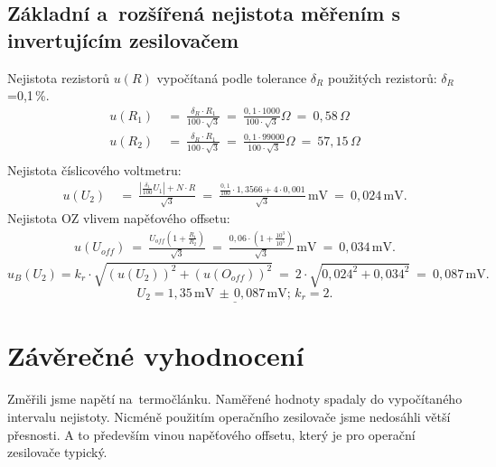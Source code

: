 \documentclass[a4paper,12pt]{article}   %
\begin{document}
\subsection{Základní a~rozšířená nejistota měřením s invertujícím zesilovačem}
Nejistota rezistorů $u(R)$ vypočítaná podle tolerance $\delta_R$ použitých rezistorů: $\delta_R$=0,1\,\%.
\begin{equation*}
    \begin{split}
        u(R_1)&~=~\frac{\delta_R\cdot R_1}{100\cdot\sqrt{3}}~=~\frac{0,1\cdot 1000}{100\cdot\sqrt{3}} \Omega~=~0,58\,\Omega\\
        u(R_2)&~=~\frac{\delta_R\cdot R_1}{100\cdot\sqrt{3}}~=~\frac{0,1\cdot 99000}{100\cdot\sqrt{3}} \Omega~=~57,15\,\Omega\\
    \end{split}
\end{equation*}
Nejistota číslicového voltmetru:
\begin{equation*}
    \begin{split}
        u(U_2)&~=~\frac{|\frac{\delta_1}{100}U_1|+N\cdot R}{\sqrt{3}}~=~\frac{\frac{0,1}{100}\cdot 1,3566+4\cdot0,001}{\sqrt{3}}\,\textrm{mV}~=~0,024\,\textrm{mV}.
    \end{split}
\end{equation*}
Nejistota OZ vlivem napěťového offsetu:
\begin{equation*}
    \begin{split}
        u(U_{off})~=~\frac{U_{off}(1+\frac{R_1}{R_2})}{\sqrt{3}}~=~\frac{0,06\cdot (1+\frac{10^3}{10^5})}{\sqrt{3}}\,\textrm{mV}~=~0,034\,\textrm{mV}.
    \end{split}
\end{equation*}
\begin{equation*}
    u_B(U_2)=k_r\cdot\sqrt{(u(U_2))^2+(u(O_{off}))^2}~=~2\cdot\sqrt{0,024^2+0,034^2}~=~0,087\,\textrm{mV}.
\end{equation*}
\begin{equation*}
    \underline{U_2=1,35\,\textrm{mV}\,\pm\,0,087\,\textrm{mV};\,k_r=2.}
\end{equation*}
\section{Závěrečné vyhodnocení}
Změřili jsme napětí na~termočlánku. Naměřené hodnoty spadaly do vypočítaného intervalu nejistoty. Nicméně použitím operačního zesilovače jsme nedosáhli větší přesnosti. A to především vinou napěťového offsetu, který je pro operační zesilovače typický. 
\end{document}
